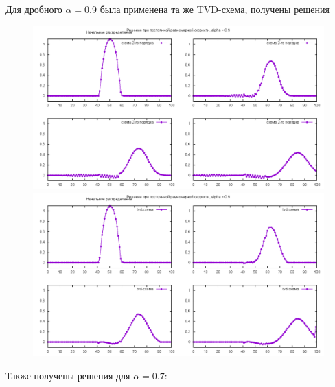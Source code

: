 Для дробного $\alpha = 0.9$ была применена та же TVD-схема, получены решения

\begin{figure}
	\includegraphics[width=1.2\linewidth]{pics/alpha09_notvd}
	\includegraphics[width=1.2\linewidth]{pics/alpha09_tvd}
\end{figure}

Также получены решения для $\alpha = 0.7$:

